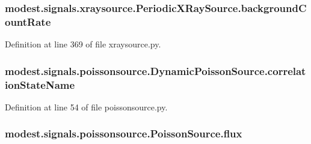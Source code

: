 \subsubsection[{\texorpdfstring{background\+Count\+Rate}{backgroundCountRate}}]{\setlength{\rightskip}{0pt plus 5cm}modest.\+signals.\+xraysource.\+Periodic\+X\+Ray\+Source.\+background\+Count\+Rate}\hypertarget{classmodest_1_1signals_1_1xraysource_1_1PeriodicXRaySource_a3a04d3f0609b7454efc4ef9cdcd7b219}{}\label{classmodest_1_1signals_1_1xraysource_1_1PeriodicXRaySource_a3a04d3f0609b7454efc4ef9cdcd7b219}


Definition at line 369 of file xraysource.\+py.

\subsubsection[{\texorpdfstring{correlation\+State\+Name}{correlationStateName}}]{\setlength{\rightskip}{0pt plus 5cm}modest.\+signals.\+poissonsource.\+Dynamic\+Poisson\+Source.\+correlation\+State\+Name\hspace{0.3cm}{\ttfamily [inherited]}}\hypertarget{classmodest_1_1signals_1_1poissonsource_1_1DynamicPoissonSource_ac7f62303bb8a417a1ddefb032c707bcd}{}\label{classmodest_1_1signals_1_1poissonsource_1_1DynamicPoissonSource_ac7f62303bb8a417a1ddefb032c707bcd}


Definition at line 54 of file poissonsource.\+py.

\subsubsection[{\texorpdfstring{flux}{flux}}]{\setlength{\rightskip}{0pt plus 5cm}modest.\+signals.\+poissonsource.\+Poisson\+Source.\+flux\hspace{0.3cm}{\ttfamily [inherited]}}\hypertarget{classmodest_1_1signals_1_1poissonsource_1_1PoissonSource_a6f2c657ad936b921715d826ac74f7fe5}{}\label{classmodest_1_1signals_1_1poissonsource_1_1PoissonSource_a6f2c657ad936b921715d826ac74f7fe5}


